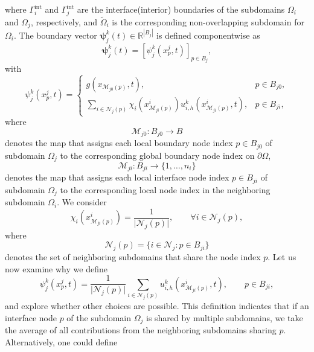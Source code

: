 \documentclass[a4paper, 11pt]{article}
\theoremstyle{remark}
\begin{document}
where $\Gamma_{i}^{\text{int}}$ and $\Gamma_{j}^{\text{int}}$ are the interface(interior) boundaries of the subdomains 
$\Omega_i$ and $\Omega_j$, respectively, and $\widetilde{\Omega}_i$ is the corresponding non-overlapping subdomain for $\Omega_i$. The 
boundary vector $\boldsymbol{\psi}_{j}^{k}(t)\in\mathbb{R}^{|B_{j}|}$ is defined componentwise as
\begin{equation*}
    \boldsymbol{\psi}_{j}^{k}(t) = [\psi_{j}^{k}(x^{j}_{p}, t)]_{p\in B_{j}},
\end{equation*}
with
\begin{equation*}
    \psi_{j}^{k}(x^{j}_{p}, t) = 
    \begin{cases}
        g(x_{\mathcal{M}_{j0}(p)}, t), & p\in B_{j0},\\[3pt]
        \sum\limits_{i\in\mathcal{N}_{j}(p)}\chi_{i}(x^{i}_{\mathcal{M}_{ji}(p)})u^{k}_{i, h}(x^{i}_{\mathcal{M}_{ji}(p)}, t), & p\in B_{ji},
    \end{cases}
\end{equation*}
where
\begin{equation*}
    \mathcal{M}_{j0} : B_{j0} \to B
\end{equation*}
denotes the map that assigns each local boundary node index $p\in B_{j0}$ of subdomain $\Omega_j$ to the corresponding global boundary node index on $\partial \Omega$,
\begin{equation*}
    \mathcal{M}_{ji} : B_{ji} \to \{1, \ldots, n_{i}\}
\end{equation*} 
denotes the map that assigns each local interface node index $p \in B_{ji}$ of subdomain $\Omega_j$ to the corresponding local node index 
in the neighboring subdomain $\Omega_i$. We consider 
\begin{equation*}
    \chi_{i}(x^{i}_{\mathcal{M}_{ji}(p)}) = \dfrac{1}{\lvert \mathcal{N}_{j}(p)\rvert}, \qquad \forall i\in\mathcal{N}_{j}(p),
\end{equation*}
where
\begin{equation*}
    \mathcal{N}_j(p) = \{i \in \mathcal{N}_j : p \in B_{ji}\}
\end{equation*}
denotes the set of neighboring subdomains that share the node index $p$. Let us now examine why we define
\begin{equation*}
    \psi_{j}^{k}(x^{j}_{p}, t) = \dfrac{1}{\lvert \mathcal{N}_{j}(p)\rvert}\sum\limits_{i\in\mathcal{N}_{j}(p)}u^{k}_{i, h}(x^{i}_{\mathcal{M}_{ji}(p)}, t), \qquad p\in B_{ji},
\end{equation*}
and explore whether other choices are possible. This definition indicates that if an interface node $p$ of the subdomain $\Omega_j$ is shared by multiple subdomains, we take the average of all contributions from the neighboring subdomains sharing $p$. Alternatively, one could define 
\end{document}
